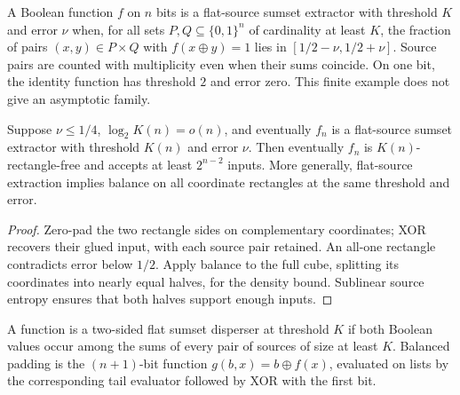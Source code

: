 \begin{definition}
  \label{def:lowerbounds-algebraic-sumset-extractor}
  \leanok
  A Boolean function $f$ on $n$ bits is a flat-source sumset extractor with
  threshold $K$ and error $\nu$ when, for all sets $P,Q\subseteq\{0,1\}^n$
  of cardinality at least $K$, the fraction of pairs $(x,y)\in P\times Q$
  with $f(x\oplus y)=1$ lies in $[1/2-\nu,1/2+\nu]$. Source pairs are
  counted with multiplicity even when their sums coincide. On one bit, the
  identity function has threshold $2$ and error zero. This finite example
  does not give an asymptotic family.
\end{definition}

\begin{theorem}
  \label{thm:lowerbounds-algebraic-extractor-hardness}
  \leanok
  Suppose $\nu\le 1/4$, $\log_2 K(n)=o(n)$, and eventually $f_n$ is a
  flat-source sumset extractor with threshold $K(n)$ and error $\nu$.
  Then eventually $f_n$ is $K(n)$-rectangle-free and accepts at least
  $2^{n-2}$ inputs. More generally, flat-source extraction implies balance
  on all coordinate rectangles at the same threshold and error.
\end{theorem}
\begin{proof}
  \leanok
  Zero-pad the two rectangle sides on complementary coordinates; XOR
  recovers their glued input, with each source pair retained. An all-one
  rectangle contradicts error below $1/2$. Apply balance to the full cube,
  splitting its coordinates into nearly equal halves, for the density bound.
  Sublinear source entropy ensures that both halves support enough inputs.
\end{proof}

\begin{definition}
  \label{def:lowerbounds-algebraic-extractor-padding}
  \leanok
  A function is a two-sided flat sumset disperser at threshold $K$ if
  both Boolean values occur among the sums of every pair of sources
  of size at least $K$. Balanced padding is the $(n+1)$-bit function
  $g(b,x)=b\oplus f(x)$, evaluated on lists by the corresponding tail
  evaluator followed by XOR with the first bit.
\end{definition}

